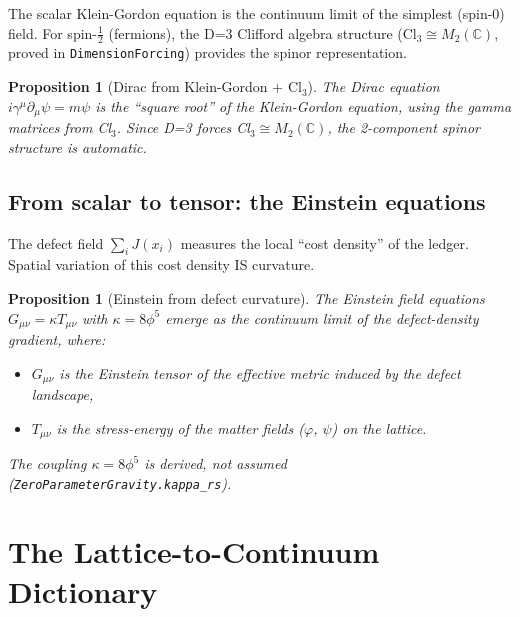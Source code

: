 \documentclass[11pt,a4paper]{article}
\theoremstyle{plain}
\newtheorem{proposition}[theorem]{Proposition}
\theoremstyle{definition}
\theoremstyle{remark}
\newcommand{\Jcost}{J}
\begin{document}
The scalar Klein-Gordon equation is the continuum limit of the simplest
(spin-0) field.  For spin-$\frac{1}{2}$ (fermions), the D=3 Clifford
algebra structure (Cl$_3 \cong M_2(\mathbb{C})$, proved in
\texttt{DimensionForcing}) provides the spinor representation.

\begin{proposition}[Dirac from Klein-Gordon $+$ Cl$_3$]
The Dirac equation $i\gamma^\mu\partial_\mu\psi = m\psi$ is the
``square root'' of the Klein-Gordon equation, using the gamma matrices
from Cl$_3$.  Since D=3 forces Cl$_3 \cong M_2(\mathbb{C})$, the
2-component spinor structure is automatic.
\end{proposition}

\subsection{From scalar to tensor: the Einstein equations}

The defect field $\sum_i \Jcost(x_i)$ measures the local ``cost density''
of the ledger.  Spatial variation of this cost density IS curvature.

\begin{proposition}[Einstein from defect curvature]
The Einstein field equations $G_{\mu\nu} = \kappa T_{\mu\nu}$ with
$\kappa = 8\phi^5$ emerge as the continuum limit of the defect-density
gradient, where:
\begin{itemize}[nosep]
\item $G_{\mu\nu}$ is the Einstein tensor of the effective metric
  induced by the defect landscape,
\item $T_{\mu\nu}$ is the stress-energy of the matter fields
  ($\varphi$, $\psi$) on the lattice.
\end{itemize}
The coupling $\kappa = 8\phi^5$ is derived, not assumed
(\texttt{ZeroParameterGravity.kappa\_rs}).
\end{proposition}

\section{The Lattice-to-Continuum Dictionary}
\label{sec:dictionary}
\end{document}
